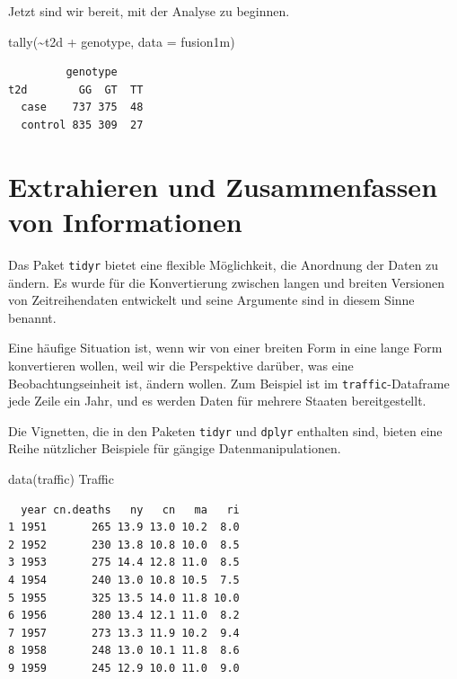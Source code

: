 \documentclass[
  ngerman,
]{scrbook}
\newenvironment{Shaded}{\begin{snugshade}}{\end{snugshade}}
\newcommand{\AttributeTok}[1]{\textcolor[rgb]{0.77,0.63,0.00}{#1}}
\newcommand{\FunctionTok}[1]{\textcolor[rgb]{0.00,0.00,0.00}{#1}}
\newcommand{\NormalTok}[1]{#1}
\newcommand{\SpecialCharTok}[1]{\textcolor[rgb]{0.00,0.00,0.00}{#1}}
\newenvironment{note}[1]
  {
  \begin{itemize}
  \renewcommand{\labelitemi}{
    \raisebox{-.01\height}[0pt][0pt]{
      {\setkeys{Gin}{width=7em,keepaspectratio}
        {\normalsize \textcolor{dark-fom-green}\faHashtag}}
        }
  }
  \begin{blackbox}
   \item
    }
    {
  \end{blackbox}
  \end{itemize}
  }
\begin{document}
Jetzt sind wir bereit, mit der Analyse zu beginnen.

\begin{Shaded}
\begin{Highlighting}[]
\FunctionTok{tally}\NormalTok{(}\SpecialCharTok{\textasciitilde{}}\NormalTok{t2d }\SpecialCharTok{+}\NormalTok{ genotype, }\AttributeTok{data =}\NormalTok{ fusion1m)}
\end{Highlighting}
\end{Shaded}

\begin{verbatim}
         genotype
t2d        GG  GT  TT
  case    737 375  48
  control 835 309  27
\end{verbatim}

\hypertarget{extrahieren-und-zusammenfassen-von-informationen}{%
\section{Extrahieren und Zusammenfassen von Informationen}\label{extrahieren-und-zusammenfassen-von-informationen}}

Das Paket \texttt{tidyr} bietet eine flexible Möglichkeit, die Anordnung der Daten zu ändern. Es wurde für die Konvertierung zwischen langen und breiten Versionen von Zeitreihendaten entwickelt und seine Argumente sind in diesem Sinne benannt.

Eine häufige Situation ist, wenn wir von einer breiten Form in eine lange Form konvertieren wollen, weil wir die Perspektive darüber, was eine Beobachtungseinheit ist, ändern wollen. Zum Beispiel ist im \texttt{traffic}-Dataframe jede Zeile ein Jahr, und es werden Daten für mehrere Staaten bereitgestellt.

\begin{note}{note}
Die Vignetten, die in den Paketen \texttt{tidyr} und \texttt{dplyr} enthalten sind, bieten eine Reihe nützlicher Beispiele für gängige Datenmanipulationen.

\end{note}

\begin{Shaded}
\begin{Highlighting}[]
\FunctionTok{data}\NormalTok{(traffic)}
\NormalTok{Traffic}
\end{Highlighting}
\end{Shaded}

\begin{verbatim}
  year cn.deaths   ny   cn   ma   ri
1 1951       265 13.9 13.0 10.2  8.0
2 1952       230 13.8 10.8 10.0  8.5
3 1953       275 14.4 12.8 11.0  8.5
4 1954       240 13.0 10.8 10.5  7.5
5 1955       325 13.5 14.0 11.8 10.0
6 1956       280 13.4 12.1 11.0  8.2
7 1957       273 13.3 11.9 10.2  9.4
8 1958       248 13.0 10.1 11.8  8.6
9 1959       245 12.9 10.0 11.0  9.0
\end{verbatim}
\end{document}
